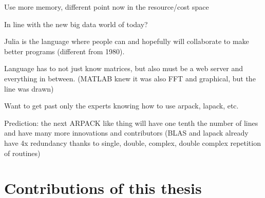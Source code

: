 Use more memory, different point now in the resource/cost space

In line with the new big data world of today?

Julia is the language where people can and hopefully will collaborate
to make better programs (different from 1980).

Language has to not just know matrices, but also must be a web server
and everything in between. (MATLAB knew it was also FFT and graphical,
but the line was drawn)

Want to get past only the experts knowing how to use arpack, lapack,
etc.

Prediction: the next ARPACK like thing will have one tenth the number
of lines and have many more innovations and contributors (BLAS and
lapack already have 4x redundancy thanks to single, double, complex,
double complex repetition of routines)

\section{Contributions of this thesis}
